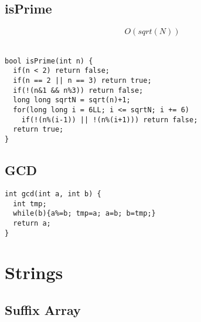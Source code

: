 \documentclass[11pt, oneside]{article}
\begin{document}
\subsection{isPrime}
\[O(sqrt(N))\]\\
\begin{lstlisting}
bool isPrime(int n) {
  if(n < 2) return false;
  if(n == 2 || n == 3) return true;
  if(!(n&1 && n%3)) return false;
  long long sqrtN = sqrt(n)+1;
  for(long long i = 6LL; i <= sqrtN; i += 6)
    if(!(n%(i-1)) || !(n%(i+1))) return false;
  return true;
}
\end{lstlisting}

\subsection{GCD}
\begin{lstlisting}
int gcd(int a, int b) {
  int tmp;
  while(b){a%=b; tmp=a; a=b; b=tmp;}
  return a;
}
\end{lstlisting}

\section{Strings}

\subsection{Suffix Array}
\end{document}
